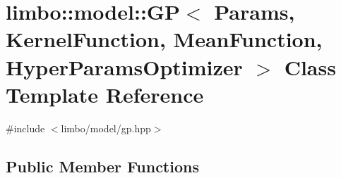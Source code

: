 \hypertarget{classlimbo_1_1model_1_1_g_p}{}\section{limbo\+:\+:model\+:\+:G\+P$<$ Params, Kernel\+Function, Mean\+Function, Hyper\+Params\+Optimizer $>$ Class Template Reference}
\label{classlimbo_1_1model_1_1_g_p}


{\ttfamily \#include $<$limbo/model/gp.\+hpp$>$}

\subsection*{Public Member Functions}
